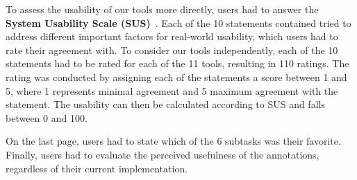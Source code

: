 To assess the usability of our tools more directly, users had to answer the \textbf{System Usability Scale (SUS)}~\cite{sus}. Each of the 10 statements contained tried to address different important factors for real-world usability, which users had to rate their agreement with. To consider our tools independently, each of the 10 statements had to be rated for each of the 11 tools, resulting in 110 ratings. The rating was conducted by assigning each of the statements a score between 1 and 5, where 1 represents minimal agreement and 5 maximum agreement with the statement. The usability can then be calculated according to SUS and falls between 0 and 100.

On the last page, users had to state which of the 6 subtasks was their favorite. Finally, users had to evaluate the perceived usefulness of the annotations, regardless of their current implementation.